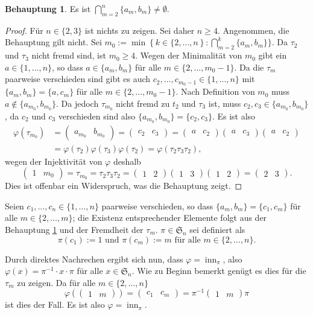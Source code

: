 \documentclass[a4paper,10pt]{article}
\theoremstyle{definition}
\newtheorem{beh}{Behauptung}
\newcommand{\Sn}{\mathfrak{S}}
\newcommand{\inn}{\operatorname{inn}}
\newcommand{\vect}[1]{\begin{pmatrix}#1\end{pmatrix}}
\begin{document}
\begin{beh}\label{beh: transpositionen gemeinsames element}
 Es ist $\bigcap_{m=2}^n \{a_m, b_m\} \neq \emptyset$.
\end{beh}
\begin{proof}
 Für $n \in \{2,3\}$ ist nichts zu zeigen. Sei daher $n \geq 4$. Angenommen, die Behauptung gilt nicht. Sei $m_0 := \min \left\{k \in \{2,\ldots,n\right\} : \bigcap_{m=2}^k \{a_m,b_m\}\}$. Da $\tau_2$ und $\tau_3$ nicht fremd sind, ist $m_0 \geq 4$. Wegen der Minimalität von $m_0$ gibt ein $a \in \{1,\ldots,n\}$, so dass $a \in \{a_m,b_m\}$ für alle $m \in \{2,\ldots,m_0-1\}$. Da die $\tau_m$ paarweise verschieden sind gibt es auch $c_2, \ldots, c_{m_0-1} \in \{1,\ldots,n\}$ mit $\{a_m, b_m\} = \{a, c_m\}$ für alle $m \in \{2, \ldots, m_0 -1\}$. Nach Definition von $m_0$ muss $a \not \in \{a_{m_0}, b_{m_0}\}$. Da jedoch $\tau_{m_0}$ nicht fremd zu $t_2$ und $\tau_3$ ist, muss $c_2, c_3 \in \{a_{m_0},b_{m_0}\}$, da $c_2$ und $c_3$ verschieden sind also $\{a_{m_0}, b_{m_0}\} = \{c_2, c_3\}$.
 Es ist also
 \begin{align*}
  \varphi(\tau_{m_0})
  &= \vect{a_{m_0} &  b_{m_0}} = \vect{c_2 & c_3} = \vect{a & c_2} \vect{a & c_3} \vect{a & c_2} \\
  &= \varphi(\tau_2)\varphi(\tau_3)\varphi(\tau_2) = \varphi(\tau_2 \tau_3 \tau_2),
 \end{align*}
 wegen der Injektivität von $\varphi$ deshalb
 \[
  \vect{1 & m_0} = \tau_{m_0} = \tau_2 \tau_3 \tau_2 = \vect{1 & 2} \vect{1 & 3} \vect{1 & 2} = \vect{2 & 3}.
 \]
 Dies ist offenbar ein Widerspruch, was die Behauptung zeigt.
\end{proof}

Seien $c_1, \ldots, c_n \in \{1,\ldots,n\}$ paarweise verschieden, so dass $\{a_m, b_m\} = \{c_1, c_m\}$ für alle $m \in \{2,\ldots,m\}$; die Existenz entsprechender Elemente folgt aus der Behauptung \ref{beh: transpositionen gemeinsames element} und der Fremdheit der $\tau_m$. $\pi \in \Sn_n$ sei definiert als
\[
 \pi(c_1) := 1 \text{ und } \pi(c_m) := m \text{ für alle } m \in \{2,\ldots,n\}.
\]

Durch direktes Nachrechen ergibt sich nun, dass $\varphi = \inn_\pi$, also $\varphi(x) = \pi^{-1} \cdot x \cdot \pi$ für alle $x \in \Sn_n$. Wie zu Beginn bemerkt genügt es dies für die $\tau_m$ zu zeigen. Da für alle $m \in \{2, \ldots, n\}$
\[
 \varphi(\vect{1 & m}) = \vect{c_1 & c_m} = \pi^{-1} \vect{1 & m} \pi
\]
ist dies der Fall. Es ist also $\varphi = \inn_\pi$.
\end{document}
